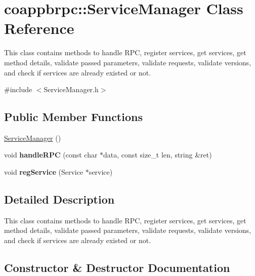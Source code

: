 \hypertarget{classcoappbrpc_1_1ServiceManager}{}\section{coappbrpc\+:\+:Service\+Manager Class Reference}
\label{classcoappbrpc_1_1ServiceManager}


This class contains methods to handle R\+PC, register services, get services, get method details, validate passed parameters, validate requests, validate versions, and check if services are already existed or not.  




{\ttfamily \#include $<$Service\+Manager.\+h$>$}

\subsection*{Public Member Functions}
\begin{DoxyCompactItemize}
\item 
\hyperlink{classcoappbrpc_1_1ServiceManager_a7d88663a8d839cf80c3e4942346fa48f}{Service\+Manager} ()
\item 
\mbox{\label{classcoappbrpc_1_1ServiceManager_a13dd031e5d5f6f22af9cbead44ed1db1}} 
void {\bfseries handle\+R\+PC} (const char $\ast$data, const size\+\_\+t len, string \&ret)
\item 
\mbox{\label{classcoappbrpc_1_1ServiceManager_ace94f3f9fbbabc2b1ce23d4267bbfa71}} 
void {\bfseries reg\+Service} (Service $\ast$service)
\end{DoxyCompactItemize}


\subsection{Detailed Description}
This class contains methods to handle R\+PC, register services, get services, get method details, validate passed parameters, validate requests, validate versions, and check if services are already existed or not. 

\subsection{Constructor \& Destructor Documentation}
\mbox{\label{classcoappbrpc_1_1ServiceManager_a7d88663a8d839cf80c3e4942346fa48f}} 

